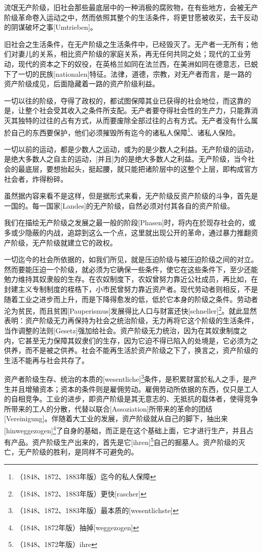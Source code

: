 \documentclass[a4paper,12pt]{ctexart}
\begin{document}
流氓无产阶级，旧社会那些最底层中的一种消极的腐败物，在有些地方，会被无产阶级革命卷入运动之中，然而依照其整个的生活条件，将更甘愿被收买，去干反动的阴谋破坏之事[Umtrieben]。

旧社会之生活条件，在无产阶级之生活条件中，已经毁灭了。无产者一无所有；他们对妻儿的关系，相比资产阶级的家庭关系，再无任何共同之处；现代的工业劳动，现代的资本之下的奴役，在英格兰如同在法兰西，在美洲如同在德意志，已蜕下了一切的民族[nationalen]特征。法律，道德，宗教，对无产者而言，是一路的资产阶级成见，后面隐藏着一路的资产阶级利益。

一切以往的阶级，夺得了政权的，都试图保障其业已获得的社会地位，而这靠的是，让整个社会受其收入之条件所支配。无产者要夺得社会性的生产力，只能靠消灭其独特的过往的占有方式，从而要废除全部过往的占有方式。无产者没有什么属於自己的东西要保护，他们必须摧毁所有迄今的诸私人保障\footnote{（1848、1872、1883年版）迄今的私人保障}、诸私人保险。

一切以前的运动，都是少数人之运动，或为的是少数人之利益。无产阶级的运动，是绝大多数人之自主的运动，[并且]为的是绝大多数人之利益。无产阶级，当今社会的最底层，要想抬起头，挺起腰，就只能把诸阶层中的这整个上层，即构成官方社会者，炸得粉碎。


虽然据内容来看不是这样，但是据形式来看，无产阶级反资产阶级的斗争，首先是一国的。每一国家[Landes]的无产阶级，自然必须对付其各自的资产阶级。

我们在描绘无产阶级之发展之最一般的阶段[Phasen]时，将内在於现存社会的，或多或少隐蔽的内战，追踪到这么一个点，这里就出现公开的革命，通过暴力推翻资产阶级，无产阶级就建立它的政权。

一切迄今的社会所依据的，如我们所见，就是压迫阶级与被压迫阶级之间的对立。然而要能压迫一个阶级，就必须为它确保一些条件，使它在这些条件下，至少还能勉力维持其奴隶般的生存。在农奴制度下，农奴曾努力靠近公社成员，再比如，在封建主义专制制度的桎梏下，小市民曾努力靠近资产者。现代劳动者则相反，不是随着工业之进步而上升，而是下降得愈发的低，低於它本身的阶级之条件。劳动者沦为贫民，而且贫困[Pauperismus]发展得比人口与财富还快[schneller]\footnote{（1848、1872、1883年版）更快[rascher]}。就此显然表明：资产阶级无力再保持为社会之统治阶级，无力再将它这个阶级的生活条件，当作调整的法则[Gesetz]强加给社会。资产阶级无力统治，因为在其奴隶制度之内，它甚至无力保障其奴隶们的生存，因为它迫不得已陷入的处境是，它必须为之供养，而不是被之供养。社会不能再生活於资产阶级之下了，换言之，资产阶级的生活不能再与社会共存了。

资产者阶级生存、统治的本质的[wesentliche]\footnote{（1848、1872、1883年版）最本质的[wesentlichste]}条件，是积累财富於私人之手，是产生并且增殖资本；资本的条件则是雇佣劳动。雇佣劳动所依据的东西，仅只是工人的自相竞争。工业的进步，即资产阶级是其无意志的、无抵抗的载体者，使得竞争所带来的工人的分散，代替以联合[Assoziation]所带来的革命的团结[Vereinigung]。伴随着大工业的发展，资产阶级就从自己的脚下，抽出来[hinweggezogen]\footnote{（1848、1872年版）抽掉[weggezogen]}了自身的基础，而正是在这个基础上面，它才进行生产，并且占有产品。资产阶级生产出来的，首先是它[ihren]\footnote{（1848、1872年版）ihre}自己的掘墓人。资产阶级的灭亡，无产阶级的胜利，是同样不可避免的。
\end{document}

